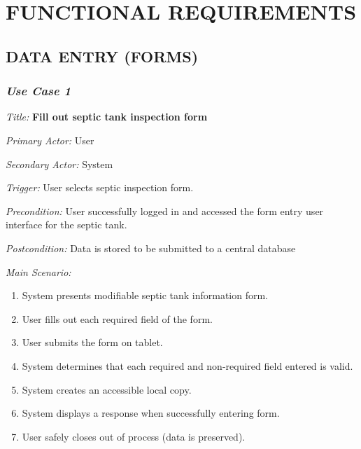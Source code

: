 \documentclass[twoside,letterpaper]{article}
\begin{document}
\clearpage\section[FUNCTIONAL REQUIREMENTS]{\rmfamily\bfseries\color{black}
FUNCTIONAL REQUIREMENTS}
\subsection[DATA ENTRY (FORMS)]{\rmfamily\bfseries\color{black}
DATA ENTRY (FORMS)}

\subsubsection{\textit{Use Case 1}}

\textit{Title: }{\bfseries\color{black} Fill out septic tank inspection form}

{\color{black} \textit{Primary Actor:} User}

{\color{black} \textit{Secondary Actor:} System}

{\color{black} \textit{Trigger:} User selects septic inspection form.}

{\color{black} \textit{Precondition:} User  successfully logged in and accessed the form entry user interface for the septic tank.}

{\color{black} \textit{Postcondition:}  Data is stored to be submitted to a central database}
\newline

{\color{black} \textit{Main Scenario:}}
\begin{enumerate}
\item System presents modifiable septic tank information form.

\item User fills out each required field of the form.

\item User submits the form on tablet.

\item System determines that each required and non-required field entered is valid.

\item System creates an accessible local copy.

\item System displays a response when successfully entering form.

\item User safely closes out of process (data is preserved).
\end{enumerate}
\end{document}
